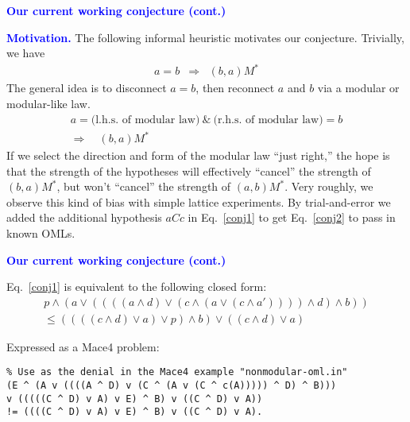 \documentclass{slides}
\begin{document}
\begin{slide}

\begin{center}
\textcolor{blue}{\textbf{Our current working conjecture (cont.)}}
\end{center}

\textcolor{blue}{\textbf{Motivation.}}
The following informal heuristic motivates our conjecture.
Trivially, we have
\begin{eqnarray}
a=b  & \Rightarrow & (b,a)M^*
\end{eqnarray}
The general idea is to disconnect $a=b$, then reconnect $a$ and $b$ via a
modular or modular-like law.
\begin{eqnarray}
a=\mbox{(l.h.s. of modular law)} \ \&\ \mbox{(r.h.s. of modular law)}=b
\nonumber\\
\Rightarrow \quad (b,a)M^* \label{conj2}
\end{eqnarray}
If we select the direction and form of the modular law ``just right,'' the
hope is that the strength of the
 hypotheses will effectively ``cancel'' the strength of
$(b,a)M^*$, but won't ``cancel'' the strength of $(a,b)M^*$.  Very
roughly, we observe this kind of bias with simple lattice experiments.
By trial-and-error we added the additional hypothesis $aCc$ in
Eq.~\ref{conj1} to get Eq.~\ref{conj2} to pass in known OMLs.

\end{slide}
\begin{slide}

\begin{center}
\textcolor{blue}{\textbf{Our current working conjecture (cont.)}}
\end{center}


Eq.~\ref{conj1} is equivalent to the following closed form:
\begin{eqnarray}
p\wedge (a\vee ((((a\wedge d)\vee (c\wedge (a\vee (c\wedge a'))))\wedge d)\wedge b))\nonumber\\
\le ((((c\wedge d)\vee a)\vee p)\wedge b)\vee ((c\wedge d)\vee a)
\end{eqnarray}


Expressed as a Mace4 problem:
\begin{verbatim}
% Use as the denial in the Mace4 example "nonmodular-oml.in"
(E ^ (A v ((((A ^ D) v (C ^ (A v (C ^ c(A))))) ^ D) ^ B)))
v (((((C ^ D) v A) v E) ^ B) v ((C ^ D) v A))
!= ((((C ^ D) v A) v E) ^ B) v ((C ^ D) v A).
\end{verbatim}

\end{slide}
\end{document}
